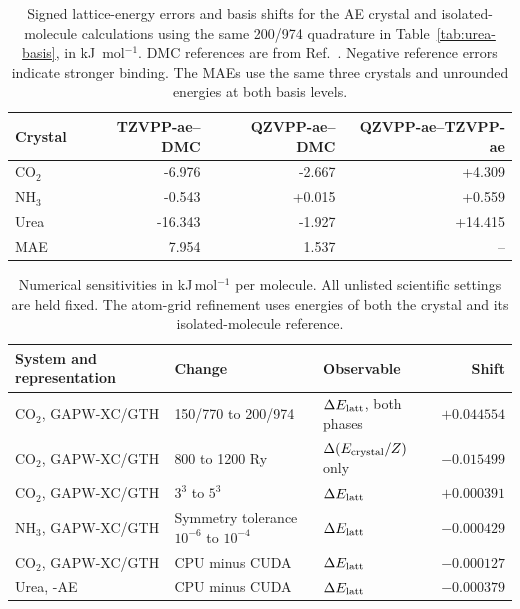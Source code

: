 \documentclass[10pt,a4paper]{article}
\begin{document}
\label{sec:crystal-basis-errors}
\begin{table}[htbp]
\centering\small
\caption{Signed lattice-energy errors and basis shifts for the AE crystal and isolated-molecule calculations using the same 200/974 quadrature in Table~\ref{tab:urea-basis}, in kJ~mol$^{-1}$. DMC references are from Ref.~. Negative reference errors indicate stronger binding. The MAEs use the same three crystals and unrounded energies at both basis levels.}
\label{tab:crystal-basis-errors}
\begin{tabular}{lrrr}
\toprule
Crystal & TZVPP-ae--DMC & QZVPP-ae--DMC & QZVPP-ae--TZVPP-ae\\
\midrule
CO$_2$ & -6.976 & -2.667 & +4.309\\
NH$_3$ & -0.543 & +0.015 & +0.559\\
Urea & -16.343 & -1.927 & +14.415\\
\midrule
MAE & 7.954 & 1.537 & --\\
\bottomrule
\end{tabular}
\end{table}


\FloatBarrier


\begin{table}[htbp]
\centering
\caption{Numerical sensitivities in kJ\,mol$^{-1}$ per molecule. All unlisted scientific settings are held fixed. The atom-grid refinement uses energies of both the crystal and its isolated-molecule reference.}
\label{tab:x23_controls_si}
\begin{tabular}{@{}p{}p{}p{}r@{}}
\toprule
System and representation & Change & Observable & Shift \\
\midrule
CO$_2$, GAPW-XC/GTH & 150/770 to 200/974 & $\Delta E_{\rm latt}$, both phases & $+0.044554$ \\
CO$_2$, GAPW-XC/GTH & 800 to 1200 Ry & $\Delta(E_{\rm crystal}/Z)$ only & $-0.015499$ \\
CO$_2$, GAPW-XC/GTH & $3^3$ to $5^3$ & $\Delta E_{\rm latt}$ & $+0.000391$ \\
NH$_3$, GAPW-XC/GTH & Symmetry tolerance $10^{-6}$ to $10^{-4}$ & $\Delta E_{\rm latt}$ & $-0.000429$ \\
CO$_2$, GAPW-XC/GTH & CPU minus CUDA & $\Delta E_{\rm latt}$ & $-0.000127$ \\
Urea, \GAPW{}-AE & CPU minus CUDA & $\Delta E_{\rm latt}$ & $-0.000379$ \\
\bottomrule
\end{tabular}
\end{table}
\end{document}
